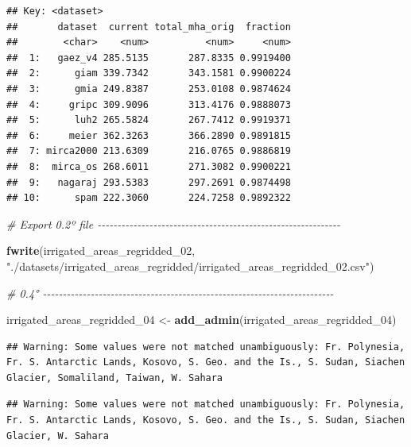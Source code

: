 \documentclass[
  11pt,
]{article}
\newenvironment{Shaded}{\begin{snugshade}}{\end{snugshade}}
\newcommand{\CommentTok}[1]{\textcolor[rgb]{0.56,0.35,0.01}{\textit{#1}}}
\newcommand{\FunctionTok}[1]{\textcolor[rgb]{0.13,0.29,0.53}{\textbf{#1}}}
\newcommand{\NormalTok}[1]{#1}
\newcommand{\OtherTok}[1]{\textcolor[rgb]{0.56,0.35,0.01}{#1}}
\newcommand{\StringTok}[1]{\textcolor[rgb]{0.31,0.60,0.02}{#1}}
\begin{document}
\begin{verbatim}
## Key: <dataset>
##       dataset  current total_mha_orig  fraction
##        <char>    <num>          <num>     <num>
##  1:   gaez_v4 285.5135       287.8335 0.9919400
##  2:      giam 339.7342       343.1581 0.9900224
##  3:      gmia 249.8387       253.0108 0.9874624
##  4:     gripc 309.9096       313.4176 0.9888073
##  5:      luh2 265.5824       267.7412 0.9919371
##  6:     meier 362.3263       366.2890 0.9891815
##  7: mirca2000 213.6309       216.0765 0.9886819
##  8:  mirca_os 268.6011       271.3082 0.9900221
##  9:   nagaraj 293.5383       297.2691 0.9874498
## 10:      spam 222.3060       224.7258 0.9892322
\end{verbatim}

\begin{Shaded}
\begin{Highlighting}[]
\CommentTok{\# Export 0.2º file {-}{-}{-}{-}{-}{-}{-}{-}{-}{-}{-}{-}{-}{-}{-}{-}{-}{-}{-}{-}{-}{-}{-}{-}{-}{-}{-}{-}{-}{-}{-}{-}{-}{-}{-}{-}{-}{-}{-}{-}{-}{-}{-}{-}{-}{-}{-}{-}{-}{-}{-}{-}{-}{-}{-}{-}{-}{-}{-}{-}{-}}

\FunctionTok{fwrite}\NormalTok{(irrigated\_areas\_regridded\_02,}
       \StringTok{"./datasets/irrigated\_areas\_regridded/irrigated\_areas\_regridded\_02.csv"}\NormalTok{)}

\CommentTok{\# 0.4° {-}{-}{-}{-}{-}{-}{-}{-}{-}{-}{-}{-}{-}{-}{-}{-}{-}{-}{-}{-}{-}{-}{-}{-}{-}{-}{-}{-}{-}{-}{-}{-}{-}{-}{-}{-}{-}{-}{-}{-}{-}{-}{-}{-}{-}{-}{-}{-}{-}{-}{-}{-}{-}{-}{-}{-}{-}{-}{-}{-}{-}{-}{-}{-}{-}{-}{-}{-}{-}{-}{-}{-}{-}}

\NormalTok{irrigated\_areas\_regridded\_04 }\OtherTok{\textless{}{-}} \FunctionTok{add\_admin}\NormalTok{(irrigated\_areas\_regridded\_04)}
\end{Highlighting}
\end{Shaded}

\begin{verbatim}
## Warning: Some values were not matched unambiguously: Fr. Polynesia, Fr. S. Antarctic Lands, Kosovo, S. Geo. and the Is., S. Sudan, Siachen Glacier, Somaliland, Taiwan, W. Sahara
\end{verbatim}

\begin{verbatim}
## Warning: Some values were not matched unambiguously: Fr. Polynesia, Fr. S. Antarctic Lands, Kosovo, S. Geo. and the Is., S. Sudan, Siachen Glacier, W. Sahara
\end{verbatim}
\end{document}
